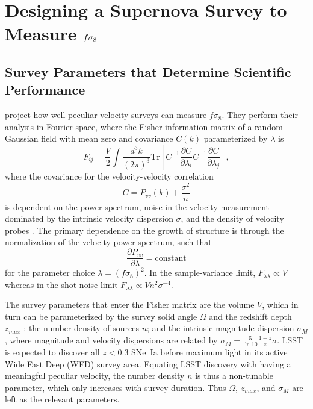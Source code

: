\documentclass{aastex62}   	%
\begin{document}
\section{Designing a Supernova Survey to Measure $\MakeLowercase{f}\sigma_8$}
\subsection{Survey Parameters that Determine Scientific Performance}
\citet{2017ApJ...847..128H} project how well peculiar velocity surveys can measure $f\sigma_8$. 
They perform their analysis in Fourier space, 
where the Fisher information matrix of a random Gaussian field with mean zero and covariance $C(k)$ parameterized by $\lambda$ is
\begin{equation}
F_{ij} = \frac{V}{2}\int \frac{d^3k}{(2\pi)^3} \text{Tr}\left[ C^{-1} \frac{\partial C}{\partial \lambda_i} C^{-1}
\frac{\partial C}{\partial \lambda_j} \right],
\end{equation}
where the covariance for the velocity-velocity correlation
\begin{equation}
C = P_{vv}(k) + \frac{\sigma^2}{n}
\label{cov:eq}
\end{equation}
is dependent on the power spectrum, noise in the velocity measurement dominated by the intrinsic velocity dispersion $\sigma$, and the density of velocity probes
\citep{2017MNRAS.464.2517H}.  
The primary dependence on the growth of structure is through the normalization of the velocity power spectrum, such that 
\begin{equation}
 \frac{\partial P_{vv}}{\partial \lambda} = \text{constant}
\end{equation}
for the parameter choice
$\lambda=(f\sigma_8)^2$.  In the sample-variance limit, $F_{\lambda \lambda} \propto V$ whereas in the shot noise limit $F_{\lambda \lambda} \propto V n^2 \sigma^{-4}$.


The survey parameters that  enter the Fisher matrix are the volume $V$, which
in turn can be parameterized by the survey solid angle $\Omega$ and the redshift depth $z_{max}$ ; the number density of sources $n$; and the intrinsic
magnitude dispersion $\sigma_M$, where magnitude and velocity dispersions are related by $\sigma_{M} = \frac{5}{\ln{10}} \frac{1+z}{z} \sigma$.
LSST is expected to discover all $z<0.3$ SNe~Ia before maximum light in its active Wide Fast Deep (WFD) survey area.
Equating LSST discovery with having a meaningful peculiar velocity, the number density $n$ is thus a non-tunable parameter, which only increases with survey duration.
Thus $\Omega$, $z_{max}$, and $\sigma_M$ are left as the relevant parameters.
\end{document}

